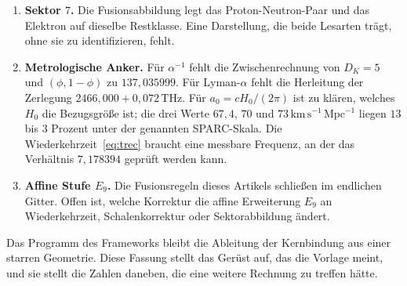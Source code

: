 \documentclass[11pt,a4paper]{article}
\theoremstyle{definition}
\theoremstyle{remark}
\newcommand{\En}{E_9}
\newcommand{\phig}{\phi}
\begin{document}
\begin{enumerate}
  \item \textbf{Sektor \(7\).}
  Die Fusionsabbildung legt das Proton-Neutron-Paar und das Elektron auf dieselbe Restklasse. Eine Darstellung, die beide Lesarten trägt, ohne sie zu identifizieren, fehlt.

  \item \textbf{Metrologische Anker.}
  Für \(\alpha^{-1}\) fehlt die Zwischenrechnung von \(D_K=5\) und \((\phig,1-\phig)\) zu \(137{,}035999\). Für Lyman-\(\alpha\) fehlt die Herleitung der Zerlegung \(2466{,}000+0{,}072\,\mathrm{THz}\). Für \(a_0=c H_0/(2\pi)\) ist zu klären, welches \(H_0\) die Bezugsgröße ist; die drei Werte \(67{,}4\), \(70\) und \(73\,\mathrm{km\,s^{-1}\,Mpc^{-1}}\) liegen \(13\) bis \(3\) Prozent unter der genannten SPARC-Skala. Die Wiederkehrzeit~\eqref{eq:trec} braucht eine messbare Frequenz, an der das Verhältnis \(7{,}178394\) geprüft werden kann.

  \item \textbf{Affine Stufe \(\En\).}
  Die Fusionsregeln dieses Artikels schließen im endlichen Gitter. Offen ist, welche Korrektur die affine Erweiterung \(\En\) an Wiederkehrzeit, Schalenkorrektur oder Sektorabbildung ändert.
\end{enumerate}

Das Programm des Frameworks bleibt die Ableitung der Kernbindung aus einer starren Geometrie. Diese Fassung stellt das Gerüst auf, das die Vorlage meint, und sie stellt die Zahlen daneben, die eine weitere Rechnung zu treffen hätte.
\end{document}
